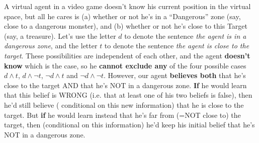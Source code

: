 \documentclass[leqno]{article}
\begin{document}
A virtual agent in a video game doesn't know his current position in the
virtual space, but all he cares is (a) whether or not he's in a ``Dangerous''
zone (say, close to a dangerous monster), and (b) whether or not he's close to
this Target (say, a treasure). Let's use the letter $d$ to denote the sentence
\textit{the agent is in a dangerous zone}, and the letter $t$ to denote the
sentence \textit{the agent is close to the target}. These possibilities are
independent of each other, and the agent \textbf{doesn't know} which is the
case, so he \textbf{cannot exclude any} of the four possible cases $d \land t$,
 $d \land \neg t$, $\neg d \land t$ and $\neg d \land \neg t$. However, our
agent \textbf{believes both} that he's close to the target AND that he's NOT in
 a dangerous zone. \textbf{If} he would learn that this belief is WRONG (i.e.
that at least one of his two beliefs is false), then he'd still believe (
conditional on this new information) that he is close to the target. But
\textbf{if} he would learn instead that he's far from (=NOT close to) the
target, then (conditional on this information) he'd keep his initial belief
that he's NOT in a dangerous zone.
\end{document}
